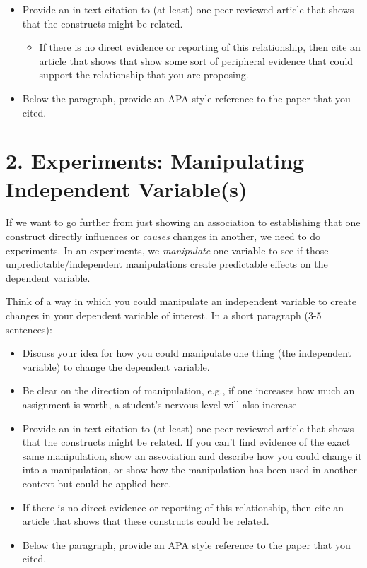 \documentclass[
]{book}
\providecommand{\tightlist}{%
  \setlength{\itemsep}{0pt}\setlength{\parskip}{0pt}}
\begin{document}
\begin{itemize}
\tightlist
\item
  Provide an in-text citation to (at least) one peer-reviewed article that shows that the constructs might be related.

  \begin{itemize}
  \tightlist
  \item
    If there is no direct evidence or reporting of this relationship, then cite an article that shows that show some sort of peripheral evidence that could support the relationship that you are proposing.
  \end{itemize}
\item
  Below the paragraph, provide an APA style reference to the paper that you cited.
\end{itemize}

\section*{2. Experiments: Manipulating Independent Variable(s)}\label{experiments-manipulating-independent-variables}

If we want to go further from just showing an association to establishing that one construct directly influences or \emph{causes} changes in another, we need to do experiments. In an experiments, we \emph{manipulate} one variable to see if those unpredictable/independent manipulations create predictable effects on the dependent variable.

Think of a way in which you could manipulate an independent variable to create changes in your dependent variable of interest. In a short paragraph (3-5 sentences):

\begin{itemize}
\tightlist
\item
  Discuss your idea for how you could manipulate one thing (the independent variable) to change the dependent variable.
\item
  Be clear on the direction of manipulation, e.g., if one increases how much an assignment is worth, a student's nervous level will also increase
\item
  Provide an in-text citation to (at least) one peer-reviewed article that shows that the constructs might be related. If you can't find evidence of the exact same manipulation, show an association and describe how you could change it into a manipulation, or show how the manipulation has been used in another context but could be applied here.
\item
  If there is no direct evidence or reporting of this relationship, then cite an article that shows that these constructs could be related.
\item
  Below the paragraph, provide an APA style reference to the paper that you cited.
\end{itemize}
\end{document}
